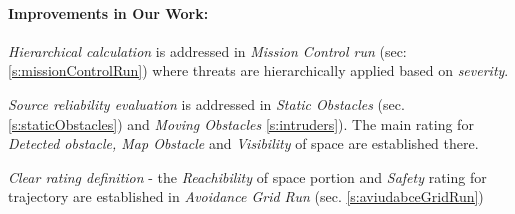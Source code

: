 \paragraph{Improvements in Our Work:}

\emph{Hierarchical calculation} is addressed in \emph{Mission Control run} (sec: \ref{s:missionControlRun}) where threats are hierarchically applied based on \emph{severity}.

\emph{Source reliability evaluation} is addressed in \emph{Static Obstacles} (sec. \ref{s:staticObstacles}) and \emph{Moving Obstacles} \ref{s:intruders}). The main rating for \emph{Detected obstacle, Map Obstacle} and \emph{Visibility} of space are established there. 

\emph{Clear rating definition} - the \emph{Reachibility} of space portion and \emph{Safety} rating for trajectory are established in \emph{Avoidance Grid Run} (sec. \ref{s:aviudabceGridRun})



